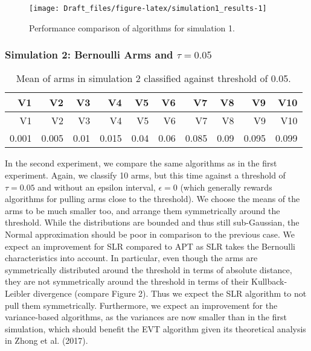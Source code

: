 \documentclass[11pt,]{article}
\begin{document}
\begin{figure}

{\centering \texttt{[image: Draft\_files/figure-latex/simulation1\_results-1]} 

}

\caption{Performance comparison of algorithms for simulation 1.}\label{fig:simulation1_results}
\end{figure}

\subsubsection{\texorpdfstring{Simulation 2: Bernoulli Arms and
\(\tau = 0.05\)
\label{sec:Simulation2}}{Simulation 2: Bernoulli Arms and \textbackslash{}tau = 0.05 }}\label{simulation-2-bernoulli-arms-and-tau-0.05}

\begin{longtable}[]{@{}rrrrrrrrrr@{}}
\caption{Mean of arms in simulation 2 classified against threshold of
0.05.}\tabularnewline
\toprule
V1 & V2 & V3 & V4 & V5 & V6 & V7 & V8 & V9 & V10\tabularnewline
\midrule
\endfirsthead
\toprule
V1 & V2 & V3 & V4 & V5 & V6 & V7 & V8 & V9 & V10\tabularnewline
\midrule
\endhead
0.001 & 0.005 & 0.01 & 0.015 & 0.04 & 0.06 & 0.085 & 0.09 & 0.095 &
0.099\tabularnewline
\bottomrule
\end{longtable}

In the second experiment, we compare the same algorithms as in the first
experiment. Again, we classify 10 arms, but this time against a
threshold of \(\tau = 0.05\) and without an epsilon interval,
\(\epsilon = 0\) (which generally rewards algorithms for pulling arms
close to the threshold). We choose the means of the arms to be much
smaller too, and arrange them symmetrically around the threshold. While
the distributions are bounded and thus still sub-Gaussian, the Normal
approximation should be poor in comparison to the previous case. We
expect an improvement for SLR compared to APT as SLR takes the Bernoulli
characteristics into account. In particular, even though the arms are
symmetrically distributed around the threshold in terms of absolute
distance, they are not symmetrically around the threshold in terms of
their Kullback-Leibler divergence (compare Figure 2). Thus we expect the
SLR algorithm to not pull them symmetrically. Furthermore, we expect an
improvement for the variance-based algorithms, as the variances are now
smaller than in the first simulation, which should benefit the EVT
algorithm given its theoretical analysis in Zhong et al. (2017).
\end{document}
